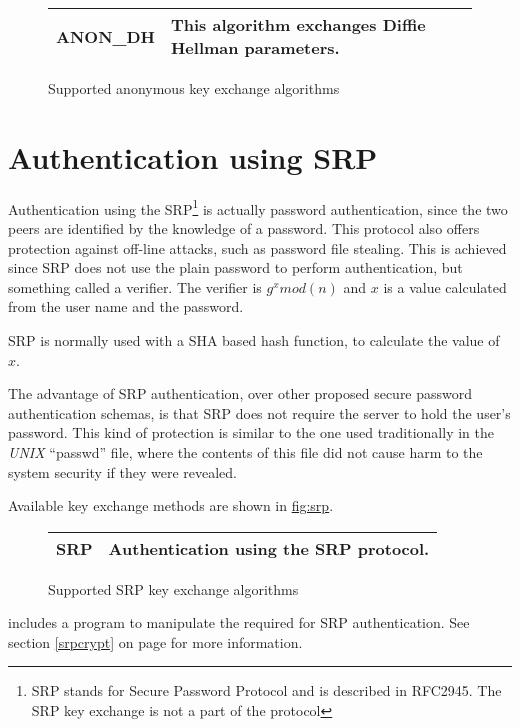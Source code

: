 \begin{figure}[hbtp]
\begin{tabular}{|l|p{9cm}|}

\hline
ANON\_DH & This algorithm exchanges Diffie Hellman parameters. 
\\
\hline
\end{tabular}

\caption{Supported anonymous key exchange algorithms}
\label{fig:anon}

\end{figure}

\section{Authentication using SRP}
Authentication using the SRP\footnote{SRP stands for Secure Password Protocol and 
is described in RFC2945. The SRP key exchange is not a part of the \tlsI{} protocol}
is actually password authentication, since the two peers are identified by the knowledge of a password. 
This protocol also offers protection against off-line attacks, such as password 
file stealing. 
This is achieved since SRP does not use the plain password to perform authentication, but something called a 
verifier. The verifier is $g^{x}mod(n)$ and $x$ is a value calculated
from the user name and the password. 
\par SRP is normally used with a SHA based hash function, to calculate
the value of $x$. 
\par The advantage of SRP authentication, over other proposed secure password 
authentication schemas, is that SRP does not require the server to hold
the user's password. This kind of protection is similar to the one used traditionally
in the \emph{UNIX} ``passwd'' file, where the contents of this file did not cause
harm to the system security if they were revealed.
\par
Available key exchange methods are shown in \hyperref{figure}{figure }{}{fig:srp}.

\begin{figure}[hbtp]
\begin{tabular}{|l|p{9cm}|}

\hline
SRP & Authentication using the SRP protocol. 
\\
\hline
\end{tabular}

\caption{Supported SRP key exchange algorithms}
\label{fig:srp}

\end{figure}

\gnutls{} includes a program to manipulate the required for SRP
authentication. See section \ref{srpcrypt} on page \pageref{srpcrypt} for
more information.

